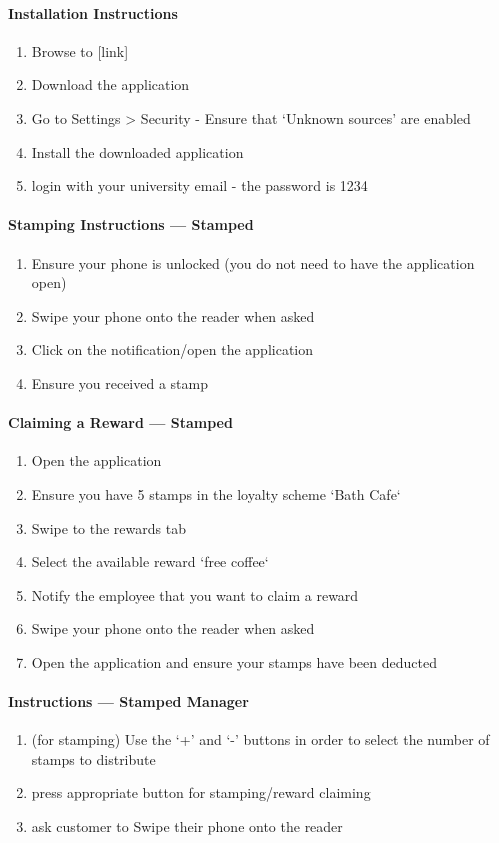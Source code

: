 \paragraph{Installation Instructions}

\begin{enumerate}
  \item Browse to [link]
  \item Download the application
  \item Go to Settings > Security - Ensure that `Unknown sources' are enabled
  \item Install the downloaded application
  \item login with your university email - the password is 1234
\end{enumerate}

\paragraph{Stamping Instructions --- Stamped}

\begin{enumerate}
  \item Ensure your phone is unlocked (you do not need to have the application open)
  \item Swipe your phone onto the reader when asked
  \item Click on the notification/open the application
  \item Ensure you received a stamp
\end{enumerate}

\paragraph{Claiming a Reward --- Stamped}

\begin{enumerate}
  \item Open the application
  \item Ensure you have 5 stamps in the loyalty scheme `Bath Cafe`
  \item Swipe to the rewards tab
  \item Select the available reward `free coffee`
  \item Notify the employee that you want to claim a reward
  \item Swipe your phone onto the reader when asked
  \item Open the application and ensure your stamps have been deducted
\end{enumerate}

\paragraph{Instructions --- Stamped Manager}

\begin{enumerate}
  \item (for stamping) Use the `+' and `-' buttons in order to select the number of stamps to distribute
  \item press appropriate button for stamping/reward claiming
  \item ask customer to Swipe their phone onto the reader
\end{enumerate}
